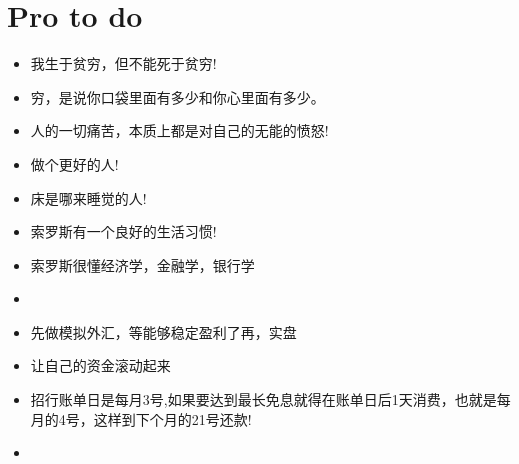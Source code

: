 \chapter{Pro to do}

\begin{itemize}
\item 我生于贫穷，但不能死于贫穷!
\item 穷，是说你口袋里面有多少和你心里面有多少。
\item 人的一切痛苦，本质上都是对自己的无能的愤怒!
\item 做个更好的人!
\item 床是哪来睡觉的人!

\item 索罗斯有一个良好的生活习惯!
\item 索罗斯很懂经济学，金融学，银行学
\item 

\item 先做模拟外汇，等能够稳定盈利了再，实盘

\item 让自己的资金滚动起来

\item 招行账单日是每月3号,如果要达到最长免息就得在账单日后1天消费，也就是每月的4号，这样到下个月的21号还款!
\item  

\end{itemize}